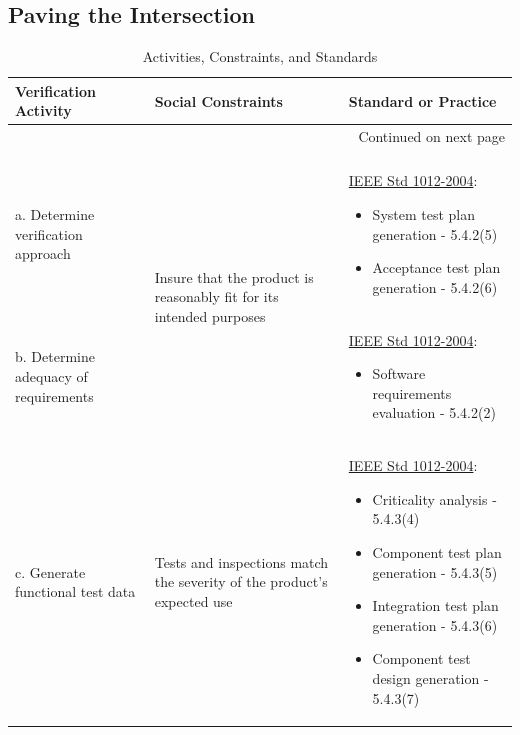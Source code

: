 \subsection{Paving the Intersection}
\singlespace
\begin{longtable}{| p{2in} | p{2in} | p{2in} |}
\caption{Activities, Constraints, and Standards}\label{thetable}\\

\hline
\textbf{Verification Activity} & \textbf{Social Constraints} & \textbf{Standard or Practice}\\
\hline
\endhead

\hline \multicolumn{3}{r}{{Continued on next page}} \\ \hline
\endfoot

\hline \hline
\endlastfoot

\multicolumn{3}{|c|}{\textit{\textbf{1. Requirements}}}\\
\hline
a. Determine verification approach & \multirow{2}{2in}{Insure that the product is reasonably fit
for its intended purposes} & \underline{IEEE Std 1012-2004}:
\begin{small}\begin{itemize}
\item System test plan generation - 5.4.2(5)
\item Acceptance test plan generation - 5.4.2(6)
\end{itemize}\end{small}\\
\cline{1-1} \cline{3-3}
b. Determine adequacy of requirements & & \underline{IEEE Std 1012-2004}:
\begin{small}\begin{itemize}
\item Software requirements evaluation - 5.4.2(2)
\end{itemize}\end{small}\\
\hline
c. Generate functional test data & Tests and inspections match the severity of
the product's expected use & \underline{IEEE Std 1012-2004}:
\begin{small}\begin{itemize}
\item Criticality analysis - 5.4.3(4)
\item Component test plan generation - 5.4.3(5)
\item Integration test plan generation - 5.4.3(6)
\item Component test design generation - 5.4.3(7)

\end{itemize}
\end{small}
\end{longtable}
